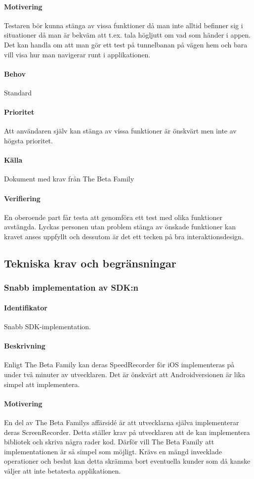 \paragraph{Motivering}
Testaren bör kunna stänga av vissa funktioner då man inte alltid befinner sig i situationer då man är bekväm att t.ex. tala högljutt om vad som händer i appen. Det kan handla om att man gör ett test på tunnelbanan på vägen hem och bara vill visa hur man navigerar runt i applikationen.
\paragraph{Behov}
Standard
\paragraph{Prioritet}
Att användaren själv kan stänga av vissa funktioner är önskvärt men inte av högsta prioritet.
\paragraph{Källa}
Dokument med krav från The Beta Family
\paragraph{Verifiering}
En oberoende part får testa att genomföra ett test med olika funktioner avstängda. Lyckas personen utan problem stänga av önskade funktioner kan kravet anses uppfyllt och dessutom är det ett tecken på bra interaktionsdesign.

\subsection{Tekniska krav och begränsningar}
\subsubsection{Snabb implementation av SDK:n}
\paragraph{Identifikator} 
Snabb SDK-implementation.
\paragraph{Beskrivning}
Enligt The Beta Family kan deras SpeedRecorder för iOS implementeras på under två minuter av utvecklaren. Det är önskvärt att Androidversionen är lika simpel att implementera.
\paragraph{Motivering}
En del av The Beta Familys affärsidé är att utvecklarna själva implementerar deras ScreenRecorder. Detta ställer krav på utvecklaren att de kan implementera bibliotek och skriva några rader kod. Därför vill The Beta Family att implementationen är så simpel som möjligt. Krävs en mängd invecklade operationer och beslut kan detta skrämma bort eventuella kunder som då kanske väljer att inte betatesta applikationen.
